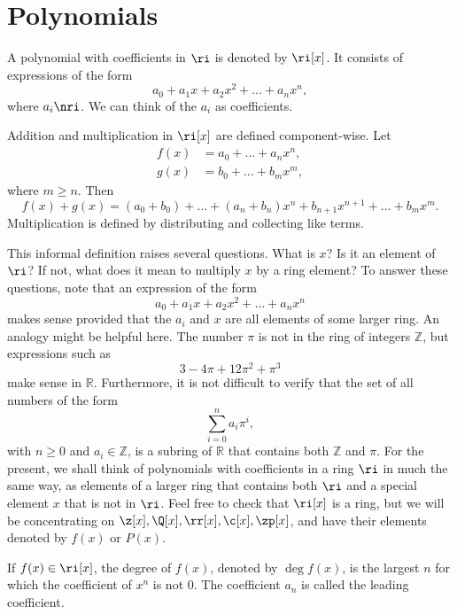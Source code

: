 
\section{Polynomials}

\begin{definition}[Polynomial]
    A polynomial with coefficients in $\ri$ is denoted by $\ri[x]$.
    It consists of expressions of the form
    \[
        a_0 + a_{1}x + a_{2}x^2 + \hdots + a_{n}x^n,
    \]
    where $a_i\nri$.
    We can think of the $a_i$ as coefficients.
\end{definition}

\begin{proposition}{
    Addition and multiplication in $\ri[x]$ are defined component-wise.
}
    Let
    \begin{align*}
        f(x) &= a_0 + \hdots + a_{n}x^n,\\
        g(x) &= b_0 + \hdots + b_{m}x^m,
    \end{align*}
    where $m\geq n$.
    Then
    \[
        f(x)+g(x) = (a_0+b_0) + \hdots + (a_n+b_n)x^n + b_{n+1}x^{n+1} + \hdots + b_{m}x^m.
    \]
    Multiplication is defined by distributing and collecting like terms.
\end{proposition}

This informal definition raises several questions.
What is $x$?
Is it an element of $\ri$?
If not, what does it mean to multiply $x$ by a ring element?
To answer these questions, note that an expression of the form
\[
    a_0 + a_{1}x + a_{2}x^2 + \ldots + a_{n}x^n
\]
makes sense provided that the $a_i$ and $x$ are all elements of some larger ring.
An analogy might be helpful here.
The number $\pi$ is not in the ring of integers $\mathbb{Z}$, but expressions such as
\[
    3 - 4\pi + 12\pi^2 + \pi^3
\]
make sense in $\mathbb{R}$.
Furthermore, it is not difficult to verify that the set of all numbers of the form
\[
    \sum_{i=0}^n a_i\pi^i,
\]
with $n\geq 0$ and $a_i\in\mathbb{Z}$, is a subring of $\mathbb{R}$ that contains both $\mathbb{Z}$ and $\pi$.
For the present, we shall think of polynomials with coefficients in a ring $\ri$ in much the same way, as elements of a larger ring that contains both $\ri$ and a special element $x$ that is not in $\ri$.
Feel free to check that $\ri[x]$ is a ring, but we will be concentrating on $\z[x],\Q[x],\rr[x],\c[x],\zp[x]$, and have their elements denoted by $f(x)$ or $P(x)$.

\begin{definition}
    If $f(x)\in\ri[x]$, the degree of $f(x)$, denoted by $\deg f(x)$, is the largest $n$ for which the coefficient of $x^n$ is not $0$.
    The coefficient $a_n$ is called the leading coefficient.
\end{definition}

